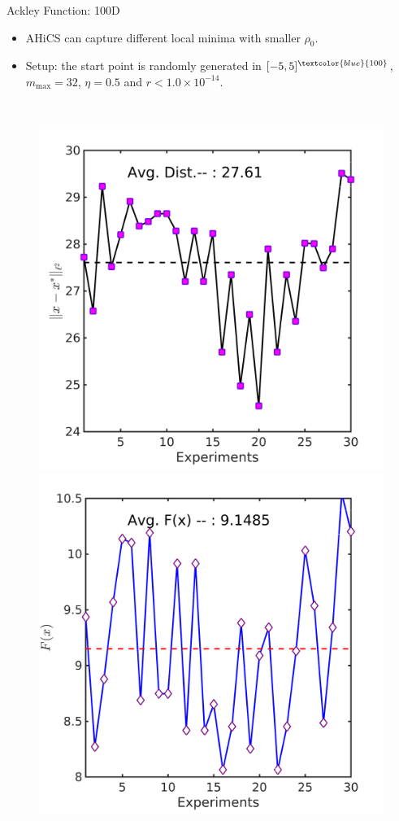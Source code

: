 \documentclass{beamer}
\begin{document}
\begin{frame}{Ackley Function: 100D}
\footnotesize{
	\begin{itemize}
		\item AHiCS can capture different local minima with
			smaller $\rho_0$.
		\item Setup: the start point is randomly generated in
			$[-5,5]^{\textcolor{blue}{100}}$, $m_{\max}=32$,
			$\eta=0.5$ and $r<1.0\times 10^{-14}$.
	\end{itemize}
}
\vspace{-0.6cm}
\begin{columns}[c]
	\column{6cm}
\begin{figure}[!htbp]
	\centering
	  \includegraphics[scale=0.1]{./figures/ackley100Drandr0_05_dist.png}
	  \includegraphics[scale=0.1]{./figures/ackley100Drandr0_05_val.png}

\end{figure}
\end{columns}
\end{frame}
\end{document}
